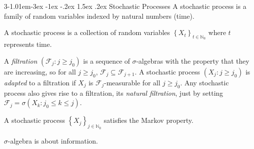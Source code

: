 \documentclass{tufte-handout}
\makeatletter
\renewcommand{\section}{\@startsection{section}%
    {3}{-1.01em}{-3ex \@plus -1ex \@minus -.2ex}%
    {1.5ex \@plus .2ex}
    {\hspace*{-5.5em}\fcolorbox{blue}{blue}{\parbox[c][1.0ex][b]{4em}{\phantom{space}}}
    \normalfont\Large\itshape\color{blue}}}
\makeatother
\begin{document}
\section{Stochastic Processes}
A stochastic process is a family of random variables indexed by natural numbers (time).

\begin{Definition}
    A stochastic process is a collection of random variables
    \(\left\{X_t\right\}_{t\in \mathbb{N}_0}\) where \(t\) represents time.
\end{Definition}


\begin{Definition}[Filtration]
    A \textit{filtration} $(\mathcal{F}_j : j \geq j_0)$ is a sequence of $\sigma$-algebras 
with the property that they are increasing, so for all $j \geq j_0$, 
$\mathcal{F}_j \subseteq \mathcal{F}_{j+1}$. A stochastic process 
$(X_j : j \geq j_0)$ is \textit{adapted} to a filtration if $X_j$ is $\mathcal{F}_j$-measurable for all $j \geq j_0$. 
Any stochastic process also gives rise to a filtration, its \textit{natural filtration}, 
just by setting $\mathcal{F}_j = \sigma(X_k : j_0 \leq k \leq j)$.
\end{Definition}

\begin{Definition}
    A stochastic process \(\left\{X_j\right\}_{j\in \mathbb{N}_0}\)
    satisfies the Markov property.
\end{Definition}

\( \sigma \)-algebra is about information.


\makeatletter
  \renewcommand{\section}{\@startsection{section}%
    {3}{0.8em}{-3ex \@plus -1ex \@minus -.2ex}%
    {1.5ex \@plus .2ex}
    {\hspace*{-5.5em}\fcolorbox{Periwinkle}{Periwinkle}{\parbox[c][1.0ex][b]{4em}{\phantom{space}}}
    \normalfont\Large\itshape\color{blue}}}
\makeatother



\end{document}
